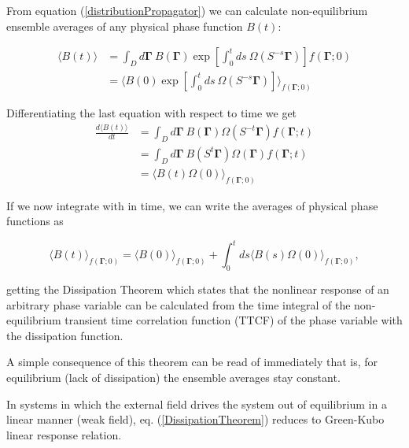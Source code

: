 \documentclass[a4paper,12pt,nofootinbib]{article}
\begin{document}
From equation (\ref{distributionPropagator}) we can calculate non-equilibrium ensemble averages of any physical phase function $B(t)$:

\begin{equation}
\begin{aligned}
	  \langle B(t) \rangle &= \int_D d\bm{\Gamma}\ B(\bm{\Gamma})\exp[\int_0^{t} ds\ \Omega(S^{-s}\bm{\Gamma})]f(\bm{\Gamma};0)\\
	  &= \langle B(0) \exp[\int_0^{t} ds\ \Omega(S^{-s}\bm{\Gamma})] \rangle_{f(\bm{\Gamma};0)}
\end{aligned}
\end{equation}

Differentiating the last equation with respect to time we get
\begin{equation}
\begin{aligned}
 \frac{d\langle B(t) \rangle}{dt}
 &= \int_D d\bm{\Gamma}\ B(\bm{\Gamma}) \Omega(S^{-t}\bm{\Gamma}) f(\bm{\Gamma};t)\\
&= \int_D d\bm{\Gamma}\ B(S^t \bm{\Gamma}) \Omega(\bm{\Gamma})f(\bm{\Gamma};t)\\
&= \langle B(t)\Omega(0) \rangle_{f(\bm{\Gamma};0)}
\end{aligned}
\end{equation}

If we now integrate with in time, we can write the averages of physical phase functions as

\begin{equation}
\langle B(t)\rangle_{f(\bm{\Gamma};0)} =\langle B(0) \rangle_{f(\bm{\Gamma};0)} +\int_0^t ds \langle B(s) \Omega(0) \rangle_{f(\bm{\Gamma};0)}, \label{DissipationTheorem}
\end{equation}

getting the Dissipation Theorem which states that the nonlinear response of an arbitrary phase variable can be calculated from the time integral of the non-equilibrium transient time correlation function (TTCF) of the phase variable with the dissipation function.




A simple consequence of this theorem can be read of immediately that is, for equilibrium (lack of dissipation) the ensemble averages stay constant.

In systems in which the external field drives the system out of equilibrium in a linear manner (weak field), eq. (\ref{DissipationTheorem}) reduces to Green-Kubo linear response relation.
\end{document}
